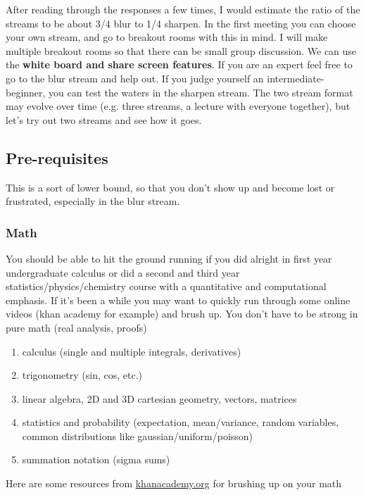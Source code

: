 \documentclass[11pt, oneside]{article}   	%
\begin{document}
After reading through the responses a few times, I would estimate the ratio of the streams to be about 3/4 blur to 1/4 sharpen. In the first meeting you can choose your own stream, and go to breakout rooms with this in mind. I will make multiple breakout rooms so that there can be small group discussion. We can use the {\bf white board and share screen features}. If you are an expert feel free to go to the blur stream and help out. If you judge yourself an intermediate-beginner, you can test the waters in the sharpen stream. The two stream format may evolve over time (e.g. three streams, a lecture with everyone together), but let's try out two streams and see how it goes.

\subsection{Pre-requisites}
This is a sort of lower bound, so that you don't show up and become lost or frustrated, especially in the blur stream.

\subsubsection{Math}
You should be able to hit the ground running if you did alright in first year undergraduate calculus or did a second and third year statistics/physics/chemistry course with a quantitative and computational emphasis. If it's been a while you may want to quickly run through some online videos (khan academy for example) and brush up. You don't have to be strong in pure math (real analysis, proofs)
\begin{enumerate}
	\item calculus (single and multiple integrals, derivatives)
	\item trigonometry (sin, cos, etc.)
	\item linear algebra, 2D and 3D cartesian geometry, vectors, matrices
	\item statistics and probability (expectation, mean/variance, random variables, common distributions like gaussian/uniform/poisson)
	\item summation notation (sigma sums)
\end{enumerate}

Here are some resources from \url{khanacademy.org} for brushing up on your math
\end{document}
